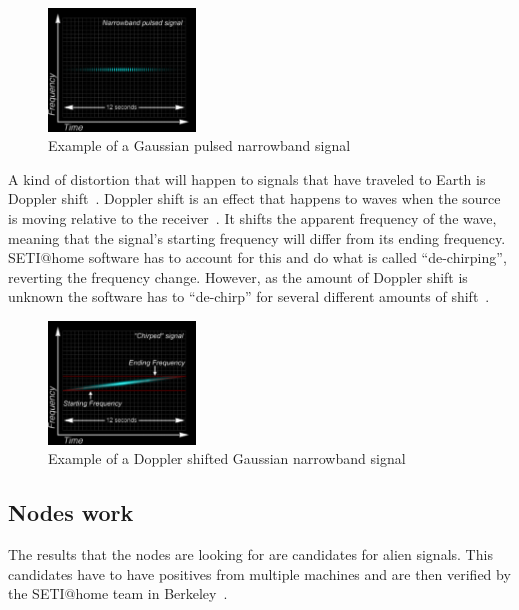 \begin{figure}[!htb]
        \centering
        \includegraphics[width=0.35\textwidth]{figures/narrow_pulsed.pdf}
        \caption{Example of a Gaussian pulsed narrowband
        signal~\cite{hid-sp18-601-www-sathome-howworks}}\label{narrowbandfigure}
\end{figure}

 A kind of distortion that will happen to signals that have traveled to Earth
 is Doppler shift~\cite{hid-sp18-601-www-doppler-light}. Doppler shift is an 
 effect that happens to waves when the 
 source is moving relative to the receiver~\cite{hid-sp18-601-www-doppler}. 
 It shifts the apparent frequency 
 of the wave, meaning that the signal's starting frequency will differ from its 
 ending frequency. SETI$@$home software has to account for this and do what 
 is called ``de-chirping'', reverting the frequency change. However, as the 
 amount of Doppler shift is unknown  the software has to ``de-chirp'' for
 several  different amounts of shift~\cite{hid-sp18-601-www-sathome-howworks}.

\begin{figure}[!htb]
        \centering
        \includegraphics[width=0.35\textwidth]{figures/narrow_chirped.pdf}
        \caption{Example of a Doppler shifted Gaussian narrowband
        signal~\cite{hid-sp18-601-www-sathome-howworks}}\label{dopplerfigure}
\end{figure}

\subsection{Nodes work}\label{hid-sp18-601-subsection-nodes-work}
The results that the nodes are looking for are candidates for alien signals.
This candidates have to have positives from multiple machines and are then 
verified by the SETI$@$home team in 
Berkeley~\cite{hid-sp18-601-www-sathome-howworks}.

